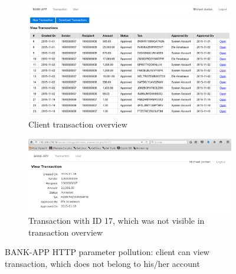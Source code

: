 \begin{figure}[ht]
	\centering
	\begin{subfigure}{.8\textwidth}
		\centering
		\includegraphics[width=\linewidth]{figures/OTG-INPVAL-004_1.png}
		\caption{Client transaction overview}
	\end{subfigure}
	\begin{subfigure}{.8\textwidth}
		\centering
		\includegraphics[width=\linewidth]{figures/OTG-INPVAL-004_2.png}
		\caption{Transaction with ID 17, which was not visible in transaction overview}
	\end{subfigure}
	\caption{BANK-APP HTTP parameter pollution: client can view transaction, which does not belong to his/her account}
	\label{fig:trans_pollut}
\end{figure}

\clearpage